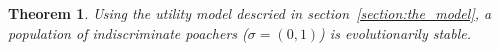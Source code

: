 \documentclass[10pt]{article}
\newtheorem{theorem}{Theorem}
\begin{document}
\begin{theorem}
Using the utility model descried in section~\ref{section:the_model}, a population 
of indiscriminate poachers (\(\sigma=(0, 1)\)) is evolutionarily stable.
\end{theorem}











\end{document}

